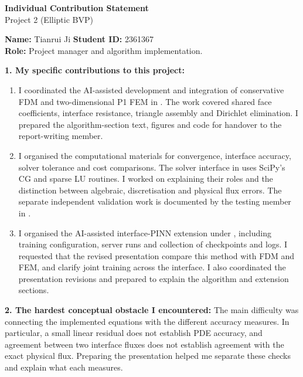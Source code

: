 \documentclass[10pt]{article}
\begin{document}
\begin{center}
    {\Large\bfseries Individual Contribution Statement}\\[0.2em]
    {\large Project 2 (Elliptic BVP)}
\end{center}

\begin{formbox}
\textbf{Name:} Tianrui Ji \hfill \textbf{Student ID:} 2361367\\
\textbf{Role:} Project manager and algorithm implementation.

\textbf{1. My specific contributions to this project:}
\begin{enumerate}[leftmargin=2em,itemsep=0.25em,topsep=0.15em]
    \item I coordinated the AI-assisted development and integration of
    conservative FDM and two-dimensional P1 FEM in
    . The work covered
    shared face coefficients, interface resistance, triangle assembly and
    Dirichlet elimination. I prepared the algorithm-section text, figures
    and code for handover to the report-writing member.

    \item I organised the computational materials for convergence, interface
    accuracy, solver tolerance and cost comparisons. The solver interface in
     uses SciPy's CG and sparse
    LU routines. I worked on explaining their roles and the distinction
    between algebraic, discretisation and physical flux errors. The separate
    independent validation work is documented by the testing member in
    .

    \item I organised the AI-assisted interface-PINN extension under
    , including training configuration, server runs
    and collection of checkpoints and logs. I requested that the revised
    presentation compare this method with FDM and FEM, and clarify joint
    training across the interface. I also coordinated the presentation
    revisions and prepared to explain the algorithm and extension sections.
\end{enumerate}

\textbf{2. The hardest conceptual obstacle I encountered:}
The main difficulty was connecting the implemented equations with the
different accuracy measures. In particular, a small linear residual does
not establish PDE accuracy, and agreement between two interface fluxes
does not establish agreement with the exact physical flux. Preparing the
presentation helped me separate these checks and explain what each measures.


\end{formbox}
\end{document}
